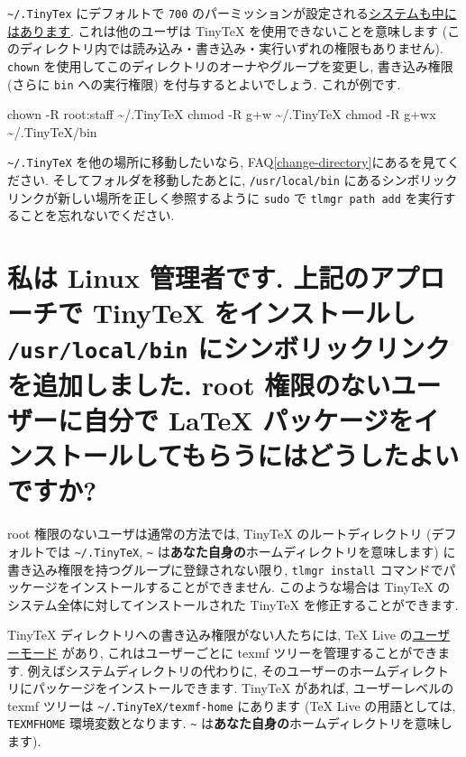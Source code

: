 \documentclass[
  xelatex,ja=standard,jafont=noto]{bxjsreport}
\newenvironment{Shaded}{\begin{snugshade}}{\end{snugshade}}
\newcommand{\AttributeTok}[1]{\textcolor[rgb]{0.77,0.63,0.00}{#1}}
\newcommand{\FunctionTok}[1]{\textcolor[rgb]{0.00,0.00,0.00}{#1}}
\newcommand{\NormalTok}[1]{#1}
\begin{document}
\texttt{\textasciitilde{}/.TinyTex} にデフォルトで \texttt{700}
のパーミッションが設定される\href{https://github.com/yihui/tinytex/issues/37}{システムも中にはあります}.
これは他のユーザは TinyTeX を使用できないことを意味します
(このディレクトリ内では読み込み・書き込み・実行いずれの権限もありません).
\texttt{chown} を使用してこのディレクトリのオーナやグループを変更し,
書き込み権限 (さらに \texttt{bin} への実行権限)
を付与するとよいでしょう. これが例です.

\begin{Shaded}
\begin{Highlighting}[]
\FunctionTok{chown} \AttributeTok{{-}R}\NormalTok{ root:staff \textasciitilde{}/.TinyTeX}
\FunctionTok{chmod} \AttributeTok{{-}R}\NormalTok{ g+w \textasciitilde{}/.TinyTeX}
\FunctionTok{chmod} \AttributeTok{{-}R}\NormalTok{ g+wx \textasciitilde{}/.TinyTeX/bin}
\end{Highlighting}
\end{Shaded}

\texttt{\textasciitilde{}/.TinyTeX} を他の場所に移動したいなら,
FAQ\ref{change-directory}にあるを見てください.
そしてフォルダを移動したあとに, \texttt{/usr/local/bin}
にあるシンボリックリンクが新しい場所を正しく参照するように \texttt{sudo}
で \texttt{tlmgr\ path\ add} を実行することを忘れないでください.

\hypertarget{non-root-package-installation}{%
\section{\texorpdfstring{私は Linux 管理者です. 上記のアプローチで
TinyTeX をインストールし \texttt{/usr/local/bin}
にシンボリックリンクを追加しました. root 権限のないユーザーに自分で
LaTeX
パッケージをインストールしてもらうにはどうしたよいですか?}{私は Linux 管理者です. 上記のアプローチで TinyTeX をインストールし /usr/local/bin にシンボリックリンクを追加しました. root 権限のないユーザーに自分で LaTeX パッケージをインストールしてもらうにはどうしたよいですか?}}\label{non-root-package-installation}}

root 権限のないユーザは通常の方法では, TinyTeX のルートディレクトリ
(デフォルトでは \texttt{\textasciitilde{}/.TinyTeX},
\texttt{\textasciitilde{}}
は\textbf{あなた自身の}ホームディレクトリを意味します)
に書き込み権限を持つグループに登録されない限り, \texttt{tlmgr\ install}
コマンドでパッケージをインストールすることができません. このような場合は
TinyTeX のシステム全体に対してインストールされた TinyTeX
を修正することができます.

TinyTeX ディレクトリへの書き込み権限がない人たちには, TeX Live
の\href{https://www.tug.org/texlive/doc/tlmgr.html\#USER-MODE}{ユーザーモード}
があり, これはユーザーごとに texmf ツリーを管理することができます.
例えばシステムディレクトリの代わりに,
そのユーザーのホームディレクトリにパッケージをインストールできます.
TinyTeX があれば, ユーザーレベルの texmf ツリーは
\texttt{\textasciitilde{}/.TinyTeX/texmf-home} にあります (TeX Live
の用語としては, \texttt{TEXMFHOME} 環境変数となります.
\texttt{\textasciitilde{}}
は\textbf{あなた自身の}ホームディレクトリを意味します).
\end{document}
